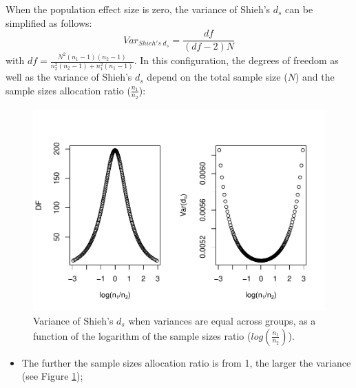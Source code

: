 \documentclass[
  english,
  man]{apa6}
\providecommand{\tightlist}{%
  \setlength{\itemsep}{0pt}\setlength{\parskip}{0pt}}
\begin{document}
When the population effect size is zero, the variance of Shieh's \(d_s\) can be simplified as follows:
\[Var_{Shieh's \; d_s} = \frac{df}{(df-2)N}\]
with \(df = \frac{N^2(n_1-1)(n_2-1)}{n_2^2(n_2-1)+n_1^2(n_1-1)}\). In this configuration, the degrees of freedom as well as the variance of Shieh's \(d_s\) depend on the total sample size (\(N\)) and the sample sizes allocation ratio (\(\frac{n_1}{n_2}\)):

\begin{figure}
\centering
\includegraphics{Theoretical-Variance-of-all-estimators-as-a-function-of-population-parameters_files/figure-latex/varshiehHomNratio2-1.pdf}
\caption{\label{fig:varshiehHomNratio2}Variance of Shieh's \(d_s\) when variances are equal across groups, as a function of the logarithm of the sample sizes ratio (\(log\left(\frac{n_1}{n_2} \right)\)).}
\end{figure}

\begin{itemize}
\tightlist
\item
  The further the sample sizes allocation ratio is from 1, the larger the variance (see Figure \ref{fig:varshiehHomNratio2});
\end{itemize}
\end{document}
